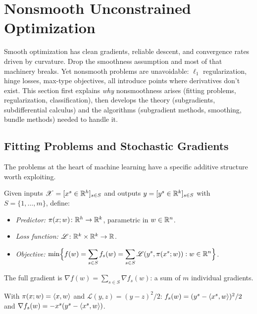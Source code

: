 \section{Nonsmooth Unconstrained Optimization}\label{sec:nonsmooth}

Smooth optimization has clean gradients, reliable descent, and convergence rates driven by curvature.
Drop the smoothness assumption and most of that machinery breaks.
Yet nonsmooth problems are unavoidable: $\ell_1$ regularization, hinge losses, max-type objectives, all introduce points where derivatives don't exist.
This section first explains \emph{why} nonsmoothness arises (fitting problems, regularization, classification), then develops the theory (subgradients, subdifferential calculus) and the algorithms (subgradient methods, smoothing, bundle methods) needed to handle it.


\subsection{Fitting Problems and Stochastic Gradients}\label{sec:fitting}

The problems at the heart of machine learning have a specific additive structure worth exploiting.

\begin{definition}\label{def:fitting}
	Given inputs $\mathcal{X} = [x^s \in \mathbb{R}^h]_{s \in S}$ and outputs $y = [y^s \in \mathbb{R}^k]_{s \in S}$ with $S = \{1, \dots, m\}$, define:
	\begin{itemize}
		\item \textit{Predictor:} $\pi(x; w) \colon \mathbb{R}^h \to \mathbb{R}^k$, parametric in $w \in \mathbb{R}^n$.
		\item \textit{Loss function:} $\mathcal{L} \colon \mathbb{R}^k \times \mathbb{R}^k \to \mathbb{R}$.
		\item \textit{Objective:}
			$\displaystyle \min\Bigl\{f(w) = \sum_{s \in S} f_s(w) = \sum_{s \in S} \mathcal{L}(y^s, \pi(x^s; w)) : w \in \mathbb{R}^n\Bigr\}$.
	\end{itemize}
	The full gradient is $\nabla f(w) = \sum_{s \in S} \nabla f_s(w)$: a sum of $m$ individual gradients.
\end{definition}

\begin{example}
	With $\pi(x; w) = \langle x, w\rangle$ and $\mathcal{L}(y, z) = (y - z)^2/2$:
	$f_s(w) = (y^s - \langle x^s, w\rangle)^2/2$ and $\nabla f_s(w) = -x^s(y^s - \langle x^s, w\rangle)$.
\end{example}

